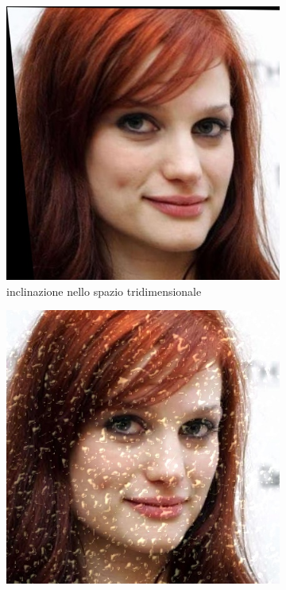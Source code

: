 \begin{figure}[h]
\begin{subfigure}{0.2\textwidth}
\includegraphics[width=\textwidth]{./Images/skew.jpg}
\caption{inclinazione nello spazio tridimensionale}
\label{sfig:corruption_skew}
\end{subfigure}\hfill
\begin{subfigure}{0.2\textwidth}
\includegraphics[width=\textwidth]{./Images/spatter_severity_3.jpg}

\end{subfigure}
\end{figure}
